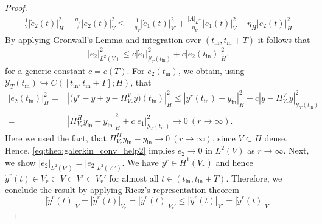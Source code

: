 \documentclass{m2an}
\newcommand{\tint}{t_{\mathrm{in}}}
\newcommand{\yint}{y_{\mathrm{in}}}
\newcommand{\mY}{{\mathscr Y}}
\newcommand{\norm}[2]{\left|#1\right|_{#2}}
\begin{document}
\begin{proof}
\begin{align}
         \tfrac{1}{2}\norm{\dot e_2(t)}{H}^2+\tfrac{\eta_V}{2}\norm{e_2(t)}{V}^2
        \leq & \tfrac{1}{\eta_V}\norm{\dot e_1(t)}{V'}^2+\tfrac{\norm{A}{L^\infty}}{\eta_V} \norm{e_1(t)}{V}^2+\eta_H\norm{e_2(t)}{H}^2
    \end{align}
    By applying Gronwall's Lemma and integration over $(\tint,\tint+T)$ it follows that
    \begin{align}\label{eq:theo:galerkin_conv_help2}
        \norm{e_2}{L^2(V)}^2\leq c\norm{\dot e_1}{\mY_T(\tint)}^2+c\norm{e_2(\tint)}{H}^2.
    \end{align}
    for a generic constant $c=c(T)$.
    For $e_2(\tint)$, we obtain, using $\mY_T(\tint)\hookrightarrow C([\tint,\tint+T];H)$, that
    \begin{align*}
      \norm{e_2(\tint)}{H}^2=&\norm{\big(y^r-y+y-\Pi^V_{V_r} y\big)(\tint)}{H}^2\leq  \norm{y^r(\tint)-\yint}{H}^2+ c \norm{y-\Pi^V_{V_r} y}{\mY_T(\tint)}^2\\
      = & \norm{\Pi^H_{V_r} \yint-\yint}{H}^2+c \norm{e_1}{\mY_T(\tint)}^2 \to 0 \ (r\to \infty).
    \end{align*}
    Here we used the fact, that $\Pi^H_{V_r}\yint-\yint \to 0 \ (r\to\infty)$, since $V\subset H$ dense.
    Hence, \eqref{eq:theo:galerkin_conv_help2} implies $e_2\to 0$ in $L^2(V)$ as $r\to\infty$. Next, we show $\norm{\dot e_2}{L^2(V')}=\norm{\dot e_2}{L^2(V_r')}$. We have $y^r\in H^1(V_r)$ and hence $\dot y^r(t)\in V_r\subset V\subset V'\subset V_r'$ for almost all $t\in (\tint,\tint+T)$. Therefore, we conclude the result by applying Riesz's representation theorem
    \begin{equation}\label{eq:hh0}
        \norm{\dot y^r(t)}{V}= \norm{\dot y^r(t)}{V_r}=\norm{\dot y^r(t)}{V_r'}\leq \norm{\dot y^r(t)}{V'}=\norm{\dot y^r(t)}{V}.

\end{equation}
\end{proof}
\end{document}
